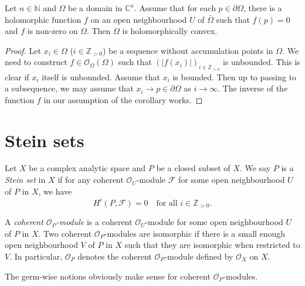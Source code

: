\begin{corollary}
    Let $n\in \mathbb{N}$ and $\Omega$ be a domain in $\mathbb{C}^n$. Assume that for each $p\in \partial \Omega$, there is a holomorphic function $f$ on an open neighbourhood $U$ of $\bar{\Omega}$ such that $f(p)=0$ and $f$ is non-zero on $\Omega$. Then $\Omega$ is holomorphically convex.
\end{corollary}
\begin{proof}
    Let $x_i\in \Omega$ ($i\in \mathbb{Z}_{>0}$) be a sequence without accumulation points in $\Omega$. We need to construct $f\in \mathcal{O}_{\Omega}(\Omega)$ such that $(|f(x_i)|)_{i\in \mathbb{Z}_{>0}}$ is unbounded. This is clear if $x_i$ itself is unbounded. Assume that $x_i$ is bounded. Then up to passing to a subsequence, we may assume that $x_i\to p\in \partial \Omega$ as $i\to\infty$. The inverse of the function $f$ in our assumption of the corollary works.
\end{proof}




\section{Stein sets}


\begin{definition}
    Let $X$ be a complex analytic space and $P$ be a closed subset of $X$. We say $P$ is a \emph{Stein set} in $X$ if for any coherent $\mathcal{O}_U$-module $\mathcal{F}$ for some open neighbourhood $U$ of $P$ in $X$, we have
    \[
        H^i(P,\mathcal{F})=0\quad \text{for all }i\in \mathbb{Z}_{>0}.  
    \]

    A \emph{coherent $\mathcal{O}_P$-module} is a coherent $\mathcal{O}_U$-module for some open neighbourhood $U$ of $P$ in $X$. Two coherent $\mathcal{O}_P$-modules are isomorphic if there is a small enough open neighbourhood $V$ of $P$ in $X$ such that they are isomorphic when restricted to $V$. In particular, $\mathcal{O}_P$ denotes the coherent $\mathcal{O}_P$-module defined by $\mathcal{O}_X$ on $X$.
    
    The germ-wise notions obviously make sense for coherent $\mathcal{O}_P$-modules.
\end{definition}

